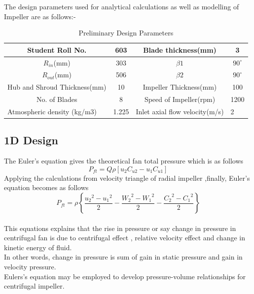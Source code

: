 \documentclass[11pt]{article}
\begin{document}
The design parameters used for analytical calculations as well as modelling of Impeller are as follows:-\\
\begin{table}[]
\centering
\begin{tabular}{|c|c|c|c|}
\hline
Student Roll No.                                  & 603                        & Blade thickness(mm)                              & 3                      \\ \hline
$R_{in}$(mm)                                           & 303                        & $\beta 1 $                                  & $90^\circ$ \\ \hline
$R_{out}$(mm)                                          & 506                        &$\beta 2 $                                   &$90^\circ$ \\ \hline
Hub and Shroud Thickness(mm)                      & 10                         & Impeller Thickness(mm)                           & 100     \\ \hline
No. of Blades                                     & 8                          & Speed of Impeller(rpm)                           & 1200    \\ \hline
\multicolumn{1}{|l|}{Atmospheric density (kg/m3)} & \multicolumn{1}{l|}{1.225} & \multicolumn{1}{l|}{Inlet axial flow velocity(m/s)} & \multicolumn{1}{l|}{2} \\ \hline
\end{tabular}
\caption{Preliminary Design Parameters}
\end{table}
\subsection{1D Design}
 The Euler's equation gives the theoretical fan total pressure which is as follows 
 $$P_{ft}=Q\rho[u_2C_{u2}-u_1C_{u1}]$$ 
 Applying the calculations from velocity triangle of radial impeller ,finally, Euler's equation becomes as follows \\
  $$P_{ft}=\rho \left\lbrace\frac{{u_2}^2-{u_1}^2}{2}-\frac{{W_2}^2-{W_1}^2}{2}-\frac{{C_2}^2-{C_1}^2}{2}\right\rbrace$$\\
  
 This equations explains that the rise in pressure or say change in pressure in centrifugal fan is due to centrifugal effect , relative velocity effect and change in kinetic energy of fluid.\\
 In other words, change in pressure is sum of gain in static pressure and gain in velocity pressure.\\
 Eulers's equation may be employed to develop pressure-volume relationships for centrifugal impeller.\\
  
\end{document}
